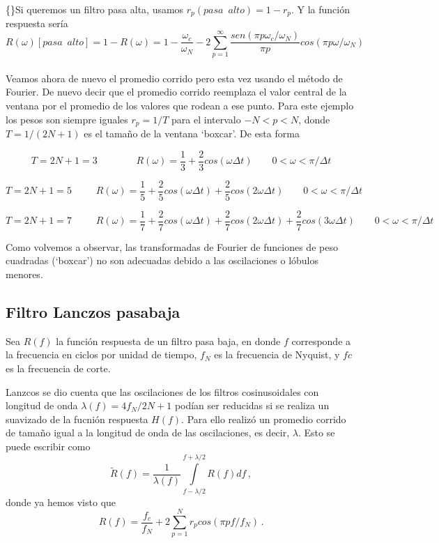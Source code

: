 \documentclass[
]{agujournal2019}
\begin{document}
\{\noindent\}Si queremos un filtro pasa alta, usamos
\(r_p({ pasa}\,\,\,{ alto})=1-r_p\). Y la función respuesta sería
\[R(\omega)[{ pasa}\,\,\,{ alto}]=1-R(\omega)=1-\frac{\omega_c}{\omega_N} - 2\sum\limits^{\infty}_{p=1}
\frac{sen(\pi p \omega_c / \omega_N)}{\pi p}cos(\pi p \omega / \omega_N)\]\\
Veamos ahora de nuevo el promedio corrido pero esta vez usando el método
de Fourier. De nuevo decir que el promedio corrido reemplaza el valor
central de la ventana por el promedio de los valores que rodean a ese
punto. Para este ejemplo los pesos son siempre iguales \(r_p=1/T\) para
el intervalo \(-N<p<N\), donde \(T=1/(2N+1)\) es el tamaño de la ventana
`boxcar'. De esta forma ~

\[T=2N+1=3\,\,\,\,\,\,\,\,\,\,\,\,\,\,\,\,\,\,\,\,\,\,\,\,
R(\omega)=\frac{1}{3} + \frac{2}{3}cos(\omega \Delta t)
\,\,\,\,\,\,\,\,\,\,\,\,0<\omega<\pi/\Delta t\]

\[T=2N+1=5\,\,\,\,\,\,\,\,\,\,\,\,\,\,\,
R(\omega)=\frac{1}{5} + \frac{2}{5}cos(\omega \Delta t)+ \frac{2}{5}cos(2\omega \Delta t)
\,\,\,\,\,\,\,\,\,\,\,\,0<\omega<\pi/\Delta t\]

\[T=2N+1=7\,\,\,\,\,\,\,\,\,\,\,\,\,\,\,
R(\omega)=\frac{1}{7} + \frac{2}{7}cos(\omega \Delta t)+ \frac{2}{7}cos(2\omega \Delta t)+ \frac{2}{7}cos(3\omega \Delta t)
\,\,\,\,\,\,\,\,\,\,\,\,0<\omega<\pi/\Delta t\]

\begin{center}
\end{center}

Como volvemos a observar, las transformadas de Fourier de funciones de
peso cuadradas (`boxcar') no son adecuadas debido a las oscilaciones o
lóbulos menores.

\subsection{Filtro Lanczos pasabaja}\label{filtro-lanczos-pasabaja}

Sea \(R(f)\) la función respuesta de un filtro pasa baja, en donde \(f\)
corresponde a la frecuencia en ciclos por unidad de tiempo, \(f_N\) es
la frecuencia de Nyquist, y \(fc\) es la frecuencia de corte.

\begin{center}
\end{center}

Lanzcos se dio cuenta que las oscilaciones de los filtros cosinusoidales
con longitud de onda \(\lambda(f)=4f_N/2N+1\) podían ser reducidas si se
realiza un suavizado de la fucnión respuesta \(H(f)\). Para ello realizó
un promedio corrido de tamaño igual a la longitud de onda de las
oscilaciones, es decir, \(\lambda\). Esto se puede escribir como
\[\widetilde{R}(f)=\frac{1}{\lambda(f)}\int\limits^{f+\lambda/2}_{f-\lambda/2} R(f) d{f}\,,\]
donde ya hemos visto que \[R(f)=\frac{f_c}{f_N} + 2\sum\limits^{N}_{p=1}
r_p cos(\pi p f / f_N)\,.\]
\end{document}
